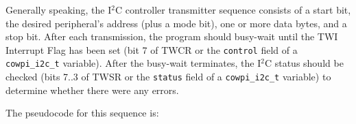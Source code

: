 Generally speaking, the I$^2$C controller transmitter sequence consists of a start bit, the desired peripheral's address (plus a mode bit), one or more data bytes, and a stop bit.
After each transmission, the program should busy-wait until the TWI Interrupt Flag has been set (bit 7 of TWCR or the \lstinline{control} field of a \lstinline{cowpi_i2c_t} variable).
After the busy-wait terminates, the I$^2$C status should be checked (bits 7..3 of TWSR or the \lstinline{status} field of a \lstinline{cowpi_i2c_t} variable) to determine whether there were any errors.

The pseudocode for this sequence is:

%
%
%
%
%
%
%

